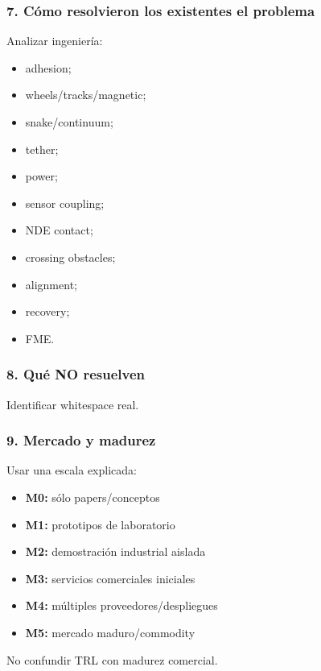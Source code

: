 \documentclass[11pt,a4paper]{article}
\begin{document}
\subsubsection*{7. Cómo resolvieron los existentes el problema}
Analizar ingeniería:

\begin{itemize}
\item adhesion;
\item wheels/tracks/magnetic;
\item snake/continuum;
\item tether;
\item power;
\item sensor coupling;
\item NDE contact;
\item crossing obstacles;
\item alignment;
\item recovery;
\item FME.
\end{itemize}


\subsubsection*{8. Qué NO resuelven}
Identificar whitespace real.


\subsubsection*{9. Mercado y madurez}
Usar una escala explicada:

\begin{itemize}
\item \textbf{M0:} sólo papers/conceptos
\item \textbf{M1:} prototipos de laboratorio
\item \textbf{M2:} demostración industrial aislada
\item \textbf{M3:} servicios comerciales iniciales
\item \textbf{M4:} múltiples proveedores/despliegues
\item \textbf{M5:} mercado maduro/commodity
\end{itemize}

No confundir TRL con madurez comercial.
\end{document}
